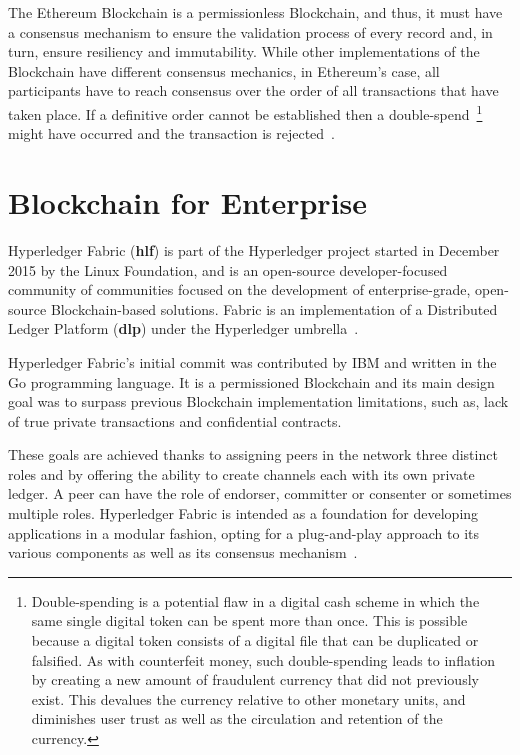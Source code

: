 The Ethereum Blockchain is a permissionless Blockchain, and thus, it must have
a consensus mechanism to ensure the validation process of every record and, in
turn, ensure resiliency and immutability. While other implementations of the
Blockchain have different consensus mechanics, in Ethereum’s case, all
participants have to reach consensus over the order of all transactions that
have taken place. If a definitive order cannot be established then a
double-spend~\footnote{Double-spending is a potential flaw in a digital cash
scheme in which the same single digital token can be spent more than once.
This is possible because a digital token consists of a digital file that can be
duplicated or falsified. As with counterfeit money, such double-spending leads
to inflation by creating a new amount of fraudulent currency that did not
previously exist. This devalues the currency relative to other monetary units,
and diminishes user trust as well as the circulation and retention of the
currency.} might have occurred and the transaction is rejected~\cite{Wood2017}.

\section{Blockchain for Enterprise}

Hyperledger Fabric (\textbf{hlf}) is part of the Hyperledger project started in
December 2015 by the Linux Foundation, and is an open-source developer-focused
community of communities focused on the development of enterprise-grade,
open-source Blockchain-based solutions.  Fabric is an implementation of a
Distributed Ledger Platform (\textbf{dlp}) under the Hyperledger
umbrella~\cite{Cachin2016}.

Hyperledger Fabric’s initial commit was contributed by IBM and written in the
Go programming language.  It is a permissioned Blockchain and its main design
goal was to surpass previous Blockchain implementation limitations, such as,
lack of true private transactions and confidential contracts.

These goals are achieved thanks to assigning peers in the network three
distinct roles and by offering the ability to create channels each with its own
private ledger.  A peer can have the role of endorser, committer or consenter
or sometimes multiple roles.  Hyperledger Fabric is intended as a foundation
for developing applications in a modular fashion, opting for a plug-and-play
approach to its various components as well as its consensus
mechanism~\cite{HyperledgerFabricDocs2017}.

